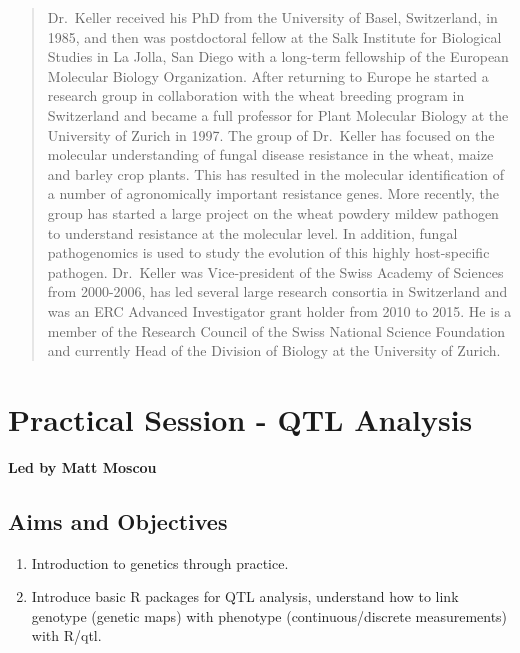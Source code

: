 \documentclass[12pt,]{book}
\providecommand{\tightlist}{%
  \setlength{\itemsep}{0pt}\setlength{\parskip}{0pt}}
\theoremstyle{definition}
\theoremstyle{definition}
\theoremstyle{remark}
\begin{document}
\begin{quote}
Dr.~Keller received his PhD from the University of Basel, Switzerland,
in 1985, and then was postdoctoral fellow at the Salk Institute for
Biological Studies in La Jolla, San Diego with a long-term fellowship of
the European Molecular Biology Organization. After returning to Europe
he started a research group in collaboration with the wheat breeding
program in Switzerland and became a full professor for Plant Molecular
Biology at the University of Zurich in 1997. The group of Dr.~Keller has
focused on the molecular understanding of fungal disease resistance in
the wheat, maize and barley crop plants. This has resulted in the
molecular identification of a number of agronomically important
resistance genes. More recently, the group has started a large project
on the wheat powdery mildew pathogen to understand resistance at the
molecular level. In addition, fungal pathogenomics is used to study the
evolution of this highly host-specific pathogen. Dr.~Keller was
Vice-president of the Swiss Academy of Sciences from 2000-2006, has led
several large research consortia in Switzerland and was an ERC Advanced
Investigator grant holder from 2010 to 2015. He is a member of the
Research Council of the Swiss National Science Foundation and currently
Head of the Division of Biology at the University of Zurich.
\end{quote}

\section*{Practical Session - QTL
Analysis}\label{practical-session---qtl-analysis}

\textbf{Led by Matt Moscou}

\subsection*{Aims and Objectives}\label{aims-and-objectives-7}

\begin{enumerate}
\def\labelenumi{\arabic{enumi}.}
\tightlist
\item
  Introduction to genetics through practice.
\item
  Introduce basic R packages for QTL analysis, understand how to link
  genotype (genetic maps) with phenotype (continuous/discrete
  measurements) with R/qtl.
\end{enumerate}
\end{document}
